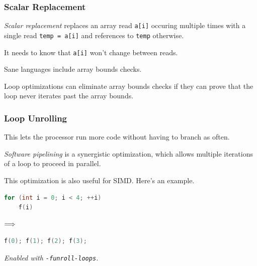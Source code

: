 \begin{frame}
\frametitle{Scalar Replacement}

\emph{Scalar replacement} replaces an array read {\tt a[i]}
occuring multiple times with a single read {\tt temp = a[i]} and references
to {\tt temp} otherwise. 

It needs to know that {\tt a[i]} won't change
between reads.

Sane languages include array bounds checks. 

Loop optimizations
can eliminate array bounds checks if they can prove that the loop
never iterates past the array bounds.


\end{frame}

\begin{frame}[fragile]
\frametitle{Loop Unrolling}

This
lets the processor run more code without having to branch
as often. 

\emph{Software pipelining} is a synergistic optimization,
which allows multiple iterations of a loop to proceed in parallel.


This optimization is also useful for SIMD. Here's an example.
\begin{center}
\vspace*{-1em}
\begin{minipage}{.3\textwidth}
  \begin{lstlisting}[language=C]
for (int i = 0; i < 4; ++i)
    f(i)
  \end{lstlisting}
  \end{minipage} $\Longrightarrow \hspace*{2em}$ \begin{minipage}{.4\textwidth}
  \begin{lstlisting}[language=C]
f(0); f(1); f(2); f(3);
  \end{lstlisting}
  \end{minipage}
  \end{center}
\noindent \emph{Enabled with {\tt -funroll-loops}.}

\end{frame}

